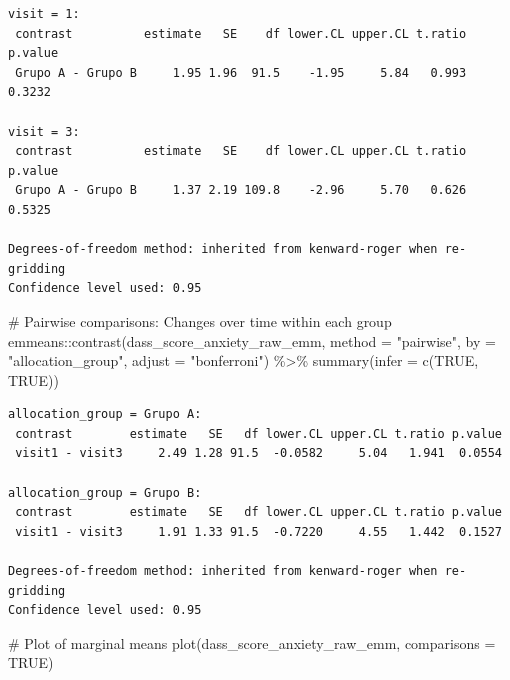 \documentclass[
  letterpaper,
  DIV=11,
  numbers=noendperiod]{scrartcl}
\newenvironment{Shaded}{\begin{snugshade}}{\end{snugshade}}
\newcommand{\AttributeTok}[1]{\textcolor[rgb]{0.40,0.45,0.13}{#1}}
\newcommand{\CommentTok}[1]{\textcolor[rgb]{0.37,0.37,0.37}{#1}}
\newcommand{\ConstantTok}[1]{\textcolor[rgb]{0.56,0.35,0.01}{#1}}
\newcommand{\FunctionTok}[1]{\textcolor[rgb]{0.28,0.35,0.67}{#1}}
\newcommand{\NormalTok}[1]{\textcolor[rgb]{0.00,0.23,0.31}{#1}}
\newcommand{\SpecialCharTok}[1]{\textcolor[rgb]{0.37,0.37,0.37}{#1}}
\newcommand{\StringTok}[1]{\textcolor[rgb]{0.13,0.47,0.30}{#1}}
\begin{document}
\begin{verbatim}
visit = 1:
 contrast          estimate   SE    df lower.CL upper.CL t.ratio p.value
 Grupo A - Grupo B     1.95 1.96  91.5    -1.95     5.84   0.993  0.3232

visit = 3:
 contrast          estimate   SE    df lower.CL upper.CL t.ratio p.value
 Grupo A - Grupo B     1.37 2.19 109.8    -2.96     5.70   0.626  0.5325

Degrees-of-freedom method: inherited from kenward-roger when re-gridding 
Confidence level used: 0.95 
\end{verbatim}

\begin{Shaded}
\begin{Highlighting}[]
\CommentTok{\# Pairwise comparisons: Changes over time within each group}
\NormalTok{emmeans}\SpecialCharTok{::}\FunctionTok{contrast}\NormalTok{(dass\_score\_anxiety\_raw\_emm, }\AttributeTok{method =} \StringTok{"pairwise"}\NormalTok{, }\AttributeTok{by =} \StringTok{"allocation\_group"}\NormalTok{, }\AttributeTok{adjust =} \StringTok{"bonferroni"}\NormalTok{) }\SpecialCharTok{\%\textgreater{}\%} \FunctionTok{summary}\NormalTok{(}\AttributeTok{infer =} \FunctionTok{c}\NormalTok{(}\ConstantTok{TRUE}\NormalTok{, }\ConstantTok{TRUE}\NormalTok{))}
\end{Highlighting}
\end{Shaded}

\begin{verbatim}
allocation_group = Grupo A:
 contrast        estimate   SE   df lower.CL upper.CL t.ratio p.value
 visit1 - visit3     2.49 1.28 91.5  -0.0582     5.04   1.941  0.0554

allocation_group = Grupo B:
 contrast        estimate   SE   df lower.CL upper.CL t.ratio p.value
 visit1 - visit3     1.91 1.33 91.5  -0.7220     4.55   1.442  0.1527

Degrees-of-freedom method: inherited from kenward-roger when re-gridding 
Confidence level used: 0.95 
\end{verbatim}

\begin{Shaded}
\begin{Highlighting}[]
\CommentTok{\# Plot of marginal means}
\FunctionTok{plot}\NormalTok{(dass\_score\_anxiety\_raw\_emm, }\AttributeTok{comparisons =} \ConstantTok{TRUE}\NormalTok{)}
\end{Highlighting}
\end{Shaded}
\end{document}
